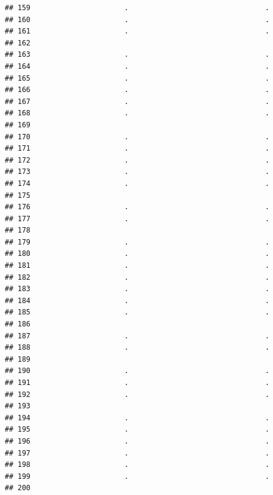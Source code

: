 \documentclass[
]{article}
\begin{document}
\begin{verbatim}
## 159                      .                                .
## 160                      .                                .
## 161                      .                                .
## 162                                                        
## 163                      .                                .
## 164                      .                                .
## 165                      .                                .
## 166                      .                                .
## 167                      .                                .
## 168                      .                                .
## 169                                                        
## 170                      .                                .
## 171                      .                                .
## 172                      .                                .
## 173                      .                                .
## 174                      .                                .
## 175                                                        
## 176                      .                                .
## 177                      .                                .
## 178                                                        
## 179                      .                                .
## 180                      .                                .
## 181                      .                                .
## 182                      .                                .
## 183                      .                                .
## 184                      .                                .
## 185                      .                                .
## 186                                                        
## 187                      .                                .
## 188                      .                                .
## 189                                                        
## 190                      .                                .
## 191                      .                                .
## 192                      .                                .
## 193                                                        
## 194                      .                                .
## 195                      .                                .
## 196                      .                                .
## 197                      .                                .
## 198                      .                                .
## 199                      .                                .
## 200                                                        

\end{verbatim}
\end{document}

